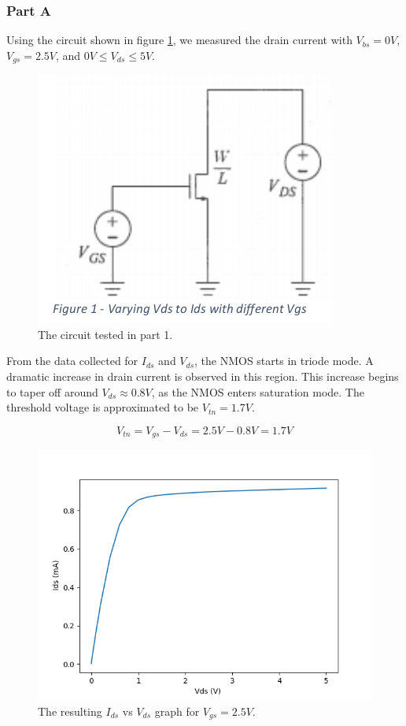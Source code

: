 \subsubsection{Part A}
		Using the circuit shown in figure \ref{fig:circuit1}, we measured the drain current with $V_{bs} = 0 V$, $V_{gs} = 2.5 V$, and $0V \le V_{ds} \le 5 V$.
		\FloatBarrier

		\begin{figure}[h!]
		\centering
		\includegraphics[scale=0.75]{./images/circuit1.png}
		\caption{The circuit tested in part 1.}
		\label{fig:circuit1}
		\end{figure}

		\FloatBarrier
		From the data collected for $I_{ds}$ and $V_{ds}$, the NMOS starts in triode mode. 
		A dramatic increase in drain current is observed in this region.
		This increase begins to taper off around $V_{ds}\approx0.8V$, as the NMOS enters saturation mode. 
		The threshold voltage is approximated to be $V_{tn} = 1.7 V$.

		\begin{equation}
		\label{eq:threshold}
		V_{tn} = V_{gs} - V_{ds} = 2.5 V - 0.8 V = 1.7 V
		\end{equation}

		\FloatBarrier

		\begin{figure}[h!]
		\centering
		\includegraphics[scale=0.75]{./data/nmos.png}
		\caption{The resulting $I_{ds}$ vs $V_{ds}$ graph for $V_{gs}=2.5V$.}
		\label{fig:nmos}
		\end{figure}

